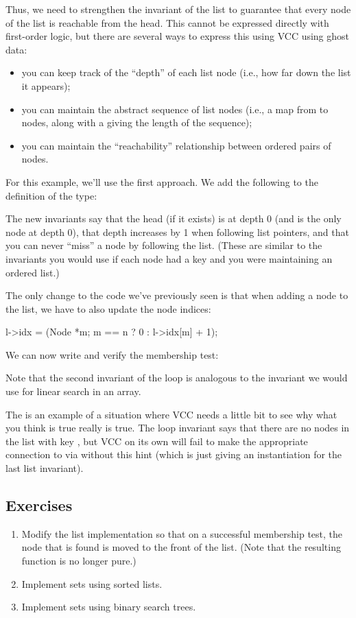 Thus, we need to strengthen the invariant of the list to guarantee
that every node of the list is reachable from the head. This cannot be
expressed directly with first-order logic, but there are several ways
to express this using VCC using ghost data:
\begin{itemize}
\item you can keep track of the ``depth'' of each list node (i.e.,
  how far down the list it appears);
\item you can maintain the abstract sequence of list nodes (i.e., a
  map from \vcc{\natural} to nodes, along with a \vcc{\natural} giving
  the length of the sequence);
\item you can maintain the ``reachability'' relationship between
  ordered pairs of nodes.
\end{itemize}

For this example, we'll use the first approach. We add the following 
to the definition of the  type:


The new invariants say that the head (if it exists) is at depth 0 (and
is the only node at depth 0), that depth increases by 1 when following
list pointers, and that you can never ``miss'' a node by following the
list. (These are similar to the invariants you would use if each node
had a key and you were maintaining an ordered list.)

The only change to the code we've previously seen is that when adding
a node to the list, we have to also update the node indices:
\begin{VCC}
l->idx = (\lambda Node *m; m == n ? 0 : l->idx[m] + 1);
\end{VCC}

We can now write and verify the membership test:

\noindent Note that the second invariant of the loop is analogous to the
invariant we would use for linear search in an array.

The  is an example of a situation where VCC needs a
little bit to see why what you think is true really is true. The loop
invariant says that there are no nodes in the list with key ,
but VCC on its own will fail to make the appropriate connection to
 via  without this hint (which is just
giving an instantiation for the last list invariant).

\subsection*{Exercises}
\begin{enumerate}
\item
Modify the list implementation so that on a successful membership
test, the node that is found is moved to the front of the list. (Note
that the resulting function is no longer pure.)
\item 
Implement sets using sorted lists.
\item
Implement sets using binary search trees.
\end{enumerate}


